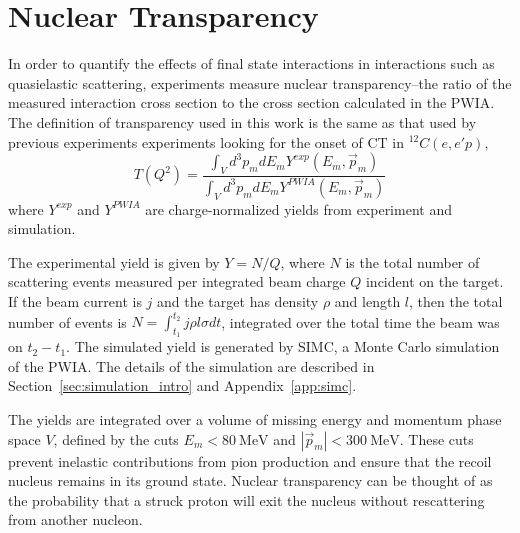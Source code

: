 \section{Nuclear Transparency}
In order to quantify the effects of final state interactions in interactions
such as quasielastic scattering, experiments measure nuclear transparency--the
ratio of
the measured interaction cross section
to
the cross section calculated in the PWIA.
The definition of transparency used in this work is the same as that used by
previous experiments experiments looking for the onset of CT in
${}^{12}C(e,e'p)$,
\begin{equation} \label{eqn:transparency_definition}
    T(Q^2) = \frac{\int_{V} d^{3} p_{m} d E_{m} Y^{exp }(E_{m}, \vec{p}_{m})}
                  {\int_{V} d^{3} p_{m} d E_{m} Y^{PWIA}(E_{m}, \vec{p}_{m})}
\end{equation}
where $Y^{exp}$ and $Y^{PWIA}$ are charge-normalized yields from experiment and
simulation.

The experimental yield is given by $Y=N/Q$, where $N$ is the total number of
scattering events measured per integrated beam charge $Q$ incident on the
target.
If the beam current is $j$ and the target has density $\rho$ and length $l$,
then the total number of events is $N=\int_{t_1}^{t_2} j \rho l \sigma dt$,
integrated over the total time the beam was on $t_2-t_1$.
The simulated yield is generated by SIMC, a Monte Carlo simulation of the PWIA.
The details of the simulation are described in
Section~\ref{sec:simulation_intro} and Appendix~\ref{app:simc}.

The yields are integrated over a volume of missing energy and momentum phase
space $V$, defined by the cuts $E_m < \SI{80}{\mega\electronvolt}$ and
$|\vec{p}_m| < \SI{300}{\mega\electronvolt}$.
These cuts prevent inelastic contributions from pion production and ensure that
the recoil nucleus remains in its ground state.
Nuclear transparency can be thought of as the probability that a struck proton
will exit the nucleus without rescattering from another nucleon.

